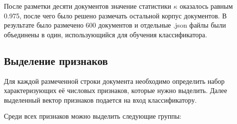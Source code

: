 \documentclass[a4paper,12pt]{article}
\begin{document}
После разметки десяти документов значение статистики $\kappa$ оказалось равным 0.975, после чего было решено размечать остальной корпус документов. В результате было размечено 600 документов и отдельные .json файлы были объединены в один, использующийся для обучения классификатора.

\subsection{Выделение признаков}

Для каждой размеченной строки документа необходимо определить набор характеризующих её числовых признаков, которые нужно выделить. Далее выделенный вектор признаков подается на вход классификатору.

Среди всех признаков можно выделить следующие группы:
\end{document}
